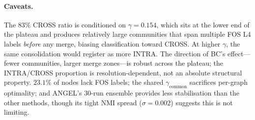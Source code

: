 \paragraph{Caveats.}
The $83\%$ CROSS ratio is conditioned on $\gamma = 0.154$, which sits at the lower end of the plateau and produces relatively large communities that span multiple FOS L4 labels \emph{before} any merge, biasing classification toward CROSS.  At higher $\gamma$, the same consolidation would register as more INTRA.  The direction of BC's effect---fewer communities, larger merge zones---is robust across the plateau; the INTRA/CROSS proportion is resolution-dependent, not an absolute structural property.  $23.1\%$ of nodes lack FOS labels; the shared $\gamma_{\text{common}}$ sacrifices per-graph optimality; and ANGEL's 30-run ensemble provides less stabilisation than the other methods, though its tight NMI spread ($\sigma = 0.002$) suggests this is not limiting.